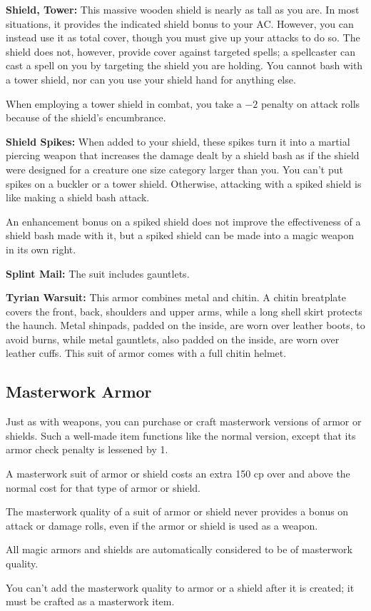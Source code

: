 \textbf{Shield, Tower:} This massive wooden shield is nearly as tall as you are. In most situations, it provides the indicated shield bonus to your AC. However, you can instead use it as total cover, though you must give up your attacks to do so. The shield does not, however, provide cover against targeted spells; a spellcaster can cast a spell on you by targeting the shield you are holding. You cannot bash with a tower shield, nor can you use your shield hand for anything else.

When employing a tower shield in combat, you take a $-2$ penalty on attack rolls because of the shield's encumbrance.

\textbf{Shield Spikes:} When added to your shield, these spikes turn it into a martial piercing weapon that increases the damage dealt by a shield bash as if the shield were designed for a creature one size category larger than you. You can't put spikes on a buckler or a tower shield. Otherwise, attacking with a spiked shield is like making a shield bash attack.

An enhancement bonus on a spiked shield does not improve the effectiveness of a shield bash made with it, but a spiked shield can be made into a magic weapon in its own right.

\textbf{Splint Mail:} The suit includes gauntlets.

\textbf{Tyrian Warsuit:} This armor combines metal and chitin. A chitin breatplate covers the front, back, shoulders and upper arms, while a long shell skirt protects the haunch. Metal shinpads, padded on the inside, are worn over leather boots, to avoid burns, while metal gauntlets, also padded on the inside, are worn over leather cuffs. This suit of armor comes with a full chitin helmet.

\subsection{Masterwork Armor}
Just as with weapons, you can purchase or craft masterwork versions of armor or shields. Such a well-made item functions like the normal version, except that its armor check penalty is lessened by 1.

A masterwork suit of armor or shield costs an extra 150 cp over and above the normal cost for that type of armor or shield.

The masterwork quality of a suit of armor or shield never provides a bonus on attack or damage rolls, even if the armor or shield is used as a weapon.

All magic armors and shields are automatically considered to be of masterwork quality.

You can't add the masterwork quality to armor or a shield after it is created; it must be crafted as a masterwork item.